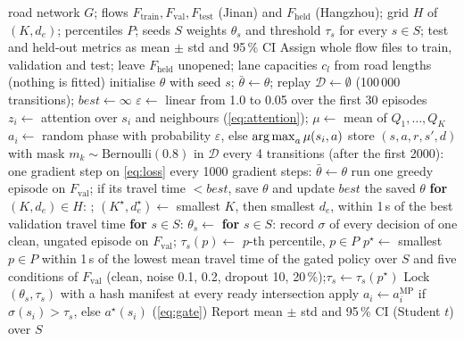 \begin{algorithm}[t]
\caption{\ugmarl{} training, tuning and evaluation}
\label{alg:ugmarl}
\footnotesize
\begin{algorithmic}[1]
\Require road network $G$; flows $F_{\mathrm{train}}, F_{\mathrm{val}}, F_{\mathrm{test}}$
(Jinan) and $F_{\mathrm{held}}$ (Hangzhou); grid $H$ of $(K,d_e)$; percentiles $P$; seeds $S$
\Ensure weights $\theta_s$ and threshold $\tau_s$ for every $s\in S$; test and held-out
metrics as mean $\pm$ std and 95\,\% CI
\State Assign whole flow files to train, validation and test; leave $F_{\mathrm{held}}$
unopened; lane capacities $c_l$ from road lengths (nothing is fitted)
 
  \State initialise $\theta$ with seed $s$; $\bar\theta\gets\theta$; replay $\mathcal D\gets\emptyset$ (100\,000 transitions); $best\gets\infty$
    \State $\varepsilon\gets$ linear from 1.0 to 0.05 over the first 30 episodes
      \State $z_i\gets$ attention over $s_i$ and neighbours (\cref{eq:attention}); $\mu\gets$ mean of $Q_1,\dots,Q_K$
      \State $a_i\gets$ random phase with probability $\varepsilon$, else $\operatorname*{arg\,max}_a\mu(s_i,a)$
      \State store $(s,a,r,s',d)$ with mask $m_k\sim\mathrm{Bernoulli}(0.8)$ in $\mathcal D$
      \State every 4 transitions (after the first 2000): one gradient step on \cref{eq:loss}
      \State every 1000 gradient steps: $\bar\theta\gets\theta$
    \EndFor
      \State run one greedy episode on $F_{\mathrm{val}}$; if its travel time $<best$, save $\theta$ and update $best$
    \EndIf
  \EndFor
  \State \Return the saved $\theta$
\EndProcedure
\State \textbf{for} $(K,d_e)\in H$: ;\quad
$(K^\star,d_e^\star)\gets$ smallest $K$, then smallest $d_e$, within 1\,s of the best validation travel time
\State \textbf{for} $s\in S$: $\theta_s\gets$ 
\State \textbf{for} $s\in S$: record $\sigma$ of every decision of one clean, ungated episode on
$F_{\mathrm{val}}$; $\tau_s(p)\gets$ $p$-th percentile, $p\in P$
\State $p^\star\gets$ smallest $p\in P$ within 1\,s of the lowest mean travel time of the gated
policy over $S$ and five conditions of $F_{\mathrm{val}}$ (clean, noise 0.1, 0.2, dropout 10, 20\,\%);\quad $\tau_s\gets\tau_s(p^\star)$
\State Lock $(\theta_s,\tau_s)$ with a hash manifest
 
  \State at every ready intersection apply $a_i\gets a_i^{\mathrm{MP}}$ if $\sigma(s_i)>\tau_s$, else $a^\star(s_i)$ (\cref{eq:gate})
\EndFor
\State Report mean $\pm$ std and 95\,\% CI (Student $t$) over $S$
\end{algorithmic}
\end{algorithm}
